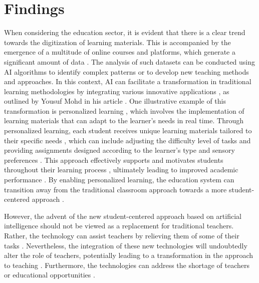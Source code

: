 \documentclass[]{lni}
\begin{document}
\section{Findings}
When considering the education sector, it is evident that there is a clear trend towards the digitization of learning materials. 
This is accompanied by the emergence of a multitude of online courses and platforms, which generate a significant amount of data \cite{Lin2023}. The analysis of 
such datasets can be conducted using AI algorithms to identify complex patterns or to develop new teaching methods and approaches.
In this context, AI can facilitate a transformation in traditional learning methodologies by integrating various innovative applications \cite{Judijanto2022}, 
as outlined by Yousuf Mohd in his article \cite{9670009}. 
%
One illustrative example of this transformation is personalized learning \cite{shemshack2020systematic}, which involves the implementation of learning materials 
that can adapt to the learner's needs in real time. Through personalized learning, each student receives unique learning materials tailored to their specific needs 
\cite{9670009}, which can include adjusting the difficulty level of tasks and providing assignments designed according to the learner's type and sensory preferences
 \cite{9457948} \cite{7742268}. This approach effectively supports and motivates students throughout their learning process \cite{shemshack2020systematic}, ultimately 
leading to improved academic performance \cite{shemshack2020systematic} \cite{9457948}.
By enabling personalized learning, the education system can transition away from the traditional classroom approach towards a more student-centered approach 
\cite{Lin2023}. 
%


However, the advent of the new student-centered approach based on artificial intelligence should not be viewed as a replacement for traditional teachers. Rather, 
the technology can assist teachers by relieving them of some of their tasks \cite{7742268} \cite{Lin2023} \cite{Tanveer2020}. Nevertheless, the integration of 
these new technologies will undoubtedly alter the role of teachers, potentially leading to a transformation in the approach to teaching 
\cite{Lin2023} \cite{9670009}.  
Furthermore, the technologies can address the shortage of teachers or educational opportunities \cite{cai2021review} \cite{Blanchard2015}.  
\end{document}
